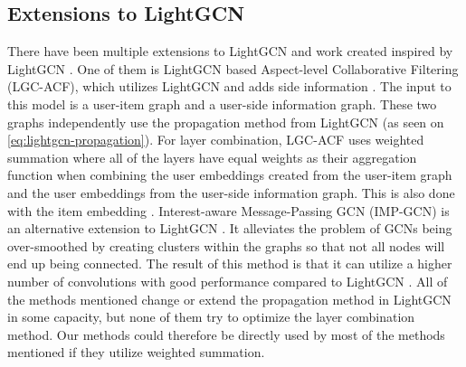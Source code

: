 \subsection{Extensions to LightGCN}
There have been multiple extensions to LightGCN and work created inspired by LightGCN \cite{LGC-ACF,IMP-GCN,SGNN,BiTGCF}.
One of them is LightGCN based Aspect-level Collaborative Filtering (LGC-ACF), which utilizes LightGCN and adds side information \cite{LGC-ACF}.
The input to this model is a user-item graph and a user-side information graph. 
These two graphs independently use the propagation method from LightGCN  (as seen on \autoref{eq:lightgcn-propagation}).
For layer combination, LGC-ACF uses weighted summation where all of the layers have equal weights as their aggregation function when combining the user embeddings created from the user-item graph and the user embeddings from the user-side information graph.
This is also done with the item embedding \cite{LGC-ACF}.
Interest-aware Message-Passing GCN (IMP-GCN) is an alternative extension to LightGCN \cite{IMP-GCN}. 
It alleviates the problem of GCNs being over-smoothed by creating clusters within the graphs so that not all nodes will end up being connected.
The result of this method is that it can utilize a higher number of convolutions with good performance compared to LightGCN \cite{IMP-GCN}. 
All of the methods mentioned change or extend the propagation method in LightGCN in some capacity, but none of them try to optimize the layer combination method.
Our methods could therefore be directly used by most of the methods mentioned if they utilize weighted summation.
